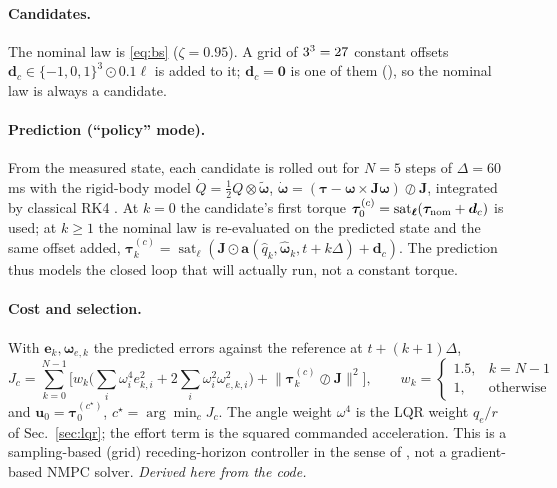 \documentclass[11pt]{article}
\newcommand{\srcroot}{../..}
\newcommand{\sat}{\operatorname{sat}}
\newcommand{\code}[1]{\path{#1}}
\theoremstyle{remark}
\newcommand{\listing}[4]{%
  \Needspace{8\baselineskip}%
  }
\begin{document}
\paragraph{Candidates.} The nominal law is \eqref{eq:bs} ($\zeta=0.95$). A grid of $3^3=27$ constant offsets
$\bm d_c\in\{-1,0,1\}^3\odot0.1\bm\ell$ is added to it; $\bm d_c=\bm0$ is one of them (\fnmpcHasZero), so the nominal law is always
a candidate.

\paragraph{Prediction (``policy'' mode).} From the measured state, each candidate is rolled out for $N=5$ steps of
$\Delta=60$\,ms with the rigid-body model $\dot Q=\frac12Q\otimes\tilde{\bm\omega}$,
$\dot{\bm\omega}=(\bm\tau-\bm\omega\times\bm J\bm\omega)\oslash\bm J$, integrated by classical RK4 \cite{hairer1993ode}. At
$k=0$ the candidate's first torque $\bm\tau^{(c)}_0=\sat_{\bm\ell}(\bm\tau_{\rm nom}+\bm d_c)$ is used; at $k\ge1$ the nominal law is
re-evaluated on the predicted state and the same offset added,
$\bm\tau^{(c)}_k=\sat_{\bm\ell}(\bm J\odot\bm a(\hat q_k,\hat{\bm\omega}_k,t+k\Delta)+\bm d_c)$. The prediction thus models the
closed loop that will actually run, not a constant torque.

\paragraph{Cost and selection.} With $\bm e_k,\bm\omega_{e,k}$ the predicted errors against the reference at $t+(k+1)\Delta$,
\begin{equation}
J_c=\sum_{k=0}^{N-1}\Big[w_k\big(\textstyle\sum_i\omega_i^4e_{k,i}^2+2\sum_i\omega_i^2\omega_{e,k,i}^2\big)+\big\|\bm\tau^{(c)}_k\oslash\bm J\big\|^2\Big],
\qquad w_k=\begin{cases}1.5,&k=N-1\\1,&\text{otherwise}\end{cases}
\label{eq:nmpc}
\end{equation}
and $\bm u_0=\bm\tau^{(c^\star)}_0$, $c^\star=\arg\min_cJ_c$. The angle weight $\omega^4$ is the LQR weight $q_e/r$ of
Sec.~\ref{sec:lqr}; the effort term is the squared commanded acceleration. This is a sampling-based (grid) receding-horizon
controller in the sense of \cite{rawlings2017mpc}, not a gradient-based NMPC solver. \emph{Derived here from the code.}

\listing{experiments/nengo_nef_replication_2026-08-29/run_mujoco_nef_baselines.py}{152}{159}{candidate grid and cost weights}
\listing{experiments/nengo_nef_replication_2026-08-29/run_mujoco_nef_baselines.py}{201}{214}{rigid-body model and RK4 step (MuJoCo's body-to-world convention)}
\listing{experiments/nengo_nef_replication_2026-08-29/run_mujoco_nef_baselines.py}{247}{289}{\code{_nmpc}: rollout, cost \eqref{eq:nmpc}, selection, one-period self-check}
\listing{experiments/final_robustness_gating_2026-09-20/run_campaign_a5_nmpc_corrected.py}{25}{26}{corrected A5 settings: no update hold}
\end{document}
